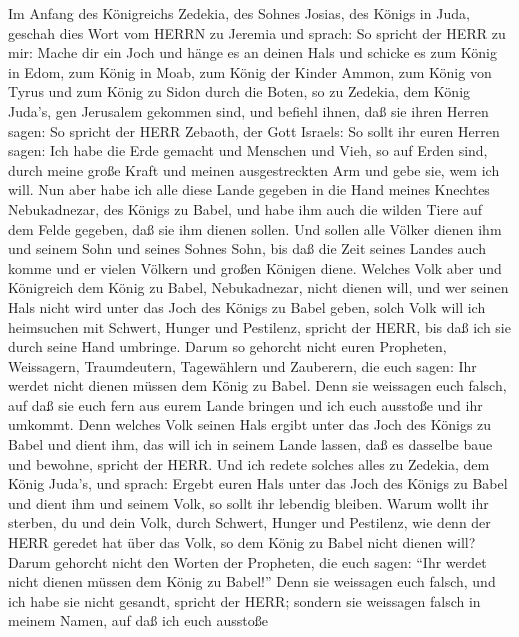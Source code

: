  Im Anfang des Königreichs Zedekia, des Sohnes Josias, des
Königs in Juda, geschah dies Wort vom HERRN zu Jeremia und sprach:
 So spricht der HERR zu mir: Mache dir ein Joch und hänge es
an deinen Hals  und schicke es zum König in Edom, zum König
in Moab, zum König der Kinder Ammon, zum König von Tyrus und zum König
zu Sidon durch die Boten, so zu Zedekia, dem König Juda's, gen Jerusalem
gekommen sind,  und befiehl ihnen, daß sie ihren Herren
sagen: So spricht der HERR Zebaoth, der Gott Israels: So sollt ihr euren
Herren sagen:  Ich habe die Erde gemacht und Menschen und
Vieh, so auf Erden sind, durch meine große Kraft und meinen
ausgestreckten Arm und gebe sie, wem ich will.  Nun aber
habe ich alle diese Lande gegeben in die Hand meines Knechtes
Nebukadnezar, des Königs zu Babel, und habe ihm auch die wilden Tiere
auf dem Felde gegeben, daß sie ihm dienen sollen.  Und
sollen alle Völker dienen ihm und seinem Sohn und seines Sohnes Sohn,
bis daß die Zeit seines Landes auch komme und er vielen Völkern und
großen Königen diene.  Welches Volk aber und Königreich dem
König zu Babel, Nebukadnezar, nicht dienen will, und wer seinen Hals
nicht wird unter das Joch des Königs zu Babel geben, solch Volk will ich
heimsuchen mit Schwert, Hunger und Pestilenz, spricht der HERR, bis daß
ich sie durch seine Hand umbringe.  Darum so gehorcht nicht
euren Propheten, Weissagern, Traumdeutern, Tagewählern und Zauberern,
die euch sagen: Ihr werdet nicht dienen müssen dem König zu Babel.
 Denn sie weissagen euch falsch, auf daß sie euch fern aus
eurem Lande bringen und ich euch ausstoße und ihr umkommt. 
Denn welches Volk seinen Hals ergibt unter das Joch des Königs zu Babel
und dient ihm, das will ich in seinem Lande lassen, daß es dasselbe baue
und bewohne, spricht der HERR.  Und ich redete solches
alles zu Zedekia, dem König Juda's, und sprach: Ergebt euren Hals unter
das Joch des Königs zu Babel und dient ihm und seinem Volk, so sollt ihr
lebendig bleiben.  Warum wollt ihr sterben, du und dein
Volk, durch Schwert, Hunger und Pestilenz, wie denn der HERR geredet hat
über das Volk, so dem König zu Babel nicht dienen will? 
Darum gehorcht nicht den Worten der Propheten, die euch sagen: ``Ihr
werdet nicht dienen müssen dem König zu Babel!'' Denn sie weissagen euch
falsch,  und ich habe sie nicht gesandt, spricht der HERR;
sondern sie weissagen falsch in meinem Namen, auf daß ich euch ausstoße
